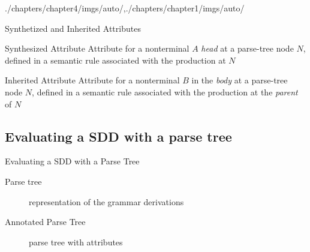 \begin{graphicspathcontext}{{./chapters/chapter4/imgs/auto/},{./chapters/chapter1/imgs/auto/}}
\begin{bibunit}[apalike]
\begin{frame}{Synthetized and Inherited Attributes}
	\begin{definitionblock}{Synthesized Attribute}
		Attribute for a nonterminal $A$ \emph{head} at a parse-tree node $N$, defined in a semantic rule associated with the production at $N$
	\end{definitionblock}
	\vspace{.5cm}
	\begin{definitionblock}{Inherited Attribute}
		Attribute for a nonterminal $B$ in the \emph{body} at a parse-tree node $N$, defined in a semantic rule associated with the production at the \emph{parent} of $N$
	\end{definitionblock}
\end{frame}

\subsection{Evaluating a SDD with a parse tree}
\subsectiontableofcontentslide

\begin{frame}{Evaluating a SDD with a Parse Tree}
	\vspace{.5cm}
	\begin{description}
	\item[Parse tree] representation of the grammar derivations
	\item[Annotated Parse Tree] parse tree with attributes
	\end{description}
	\vspace{.5cm}
	\vspace{.5cm}
\end{frame}


\end{bibunit}
\end{graphicspathcontext}
